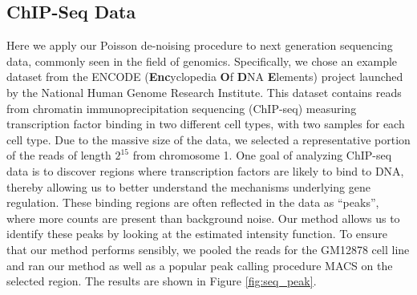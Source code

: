 \documentclass[12pt]{article}
\begin{document}
\subsection{ChIP-Seq Data}
Here we apply our Poisson de-noising procedure to next generation sequencing data, commonly seen in the field of genomics. Specifically, we chose an example dataset from the ENCODE (\textbf{Enc}yclopedia \textbf{O}f \textbf{D}NA \textbf{E}lements) project launched by the National Human Genome Research Institute. This dataset contains reads from chromatin immunoprecipitation sequencing (ChIP-seq) measuring transcription factor binding in two different cell types, with two samples for each cell type. Due to the massive size of the data, we selected a representative portion of the reads of length $2^{15}$ from chromosome 1.
One goal of analyzing ChIP-seq data is to discover regions where transcription factors are likely to bind to DNA, thereby allowing us to better understand the mechanisms underlying gene regulation. These binding regions are often reflected in the data as ``peaks'', where more counts are present than background noise. Our method allows us to identify these peaks by looking at the estimated intensity function.
To ensure that our method performs sensibly, we pooled the reads for the GM12878 cell line and ran our method as well as a popular peak calling procedure MACS on the selected region. The results are shown in Figure \ref{fig:seq_peak}.\\
\newpage
\end{document}
